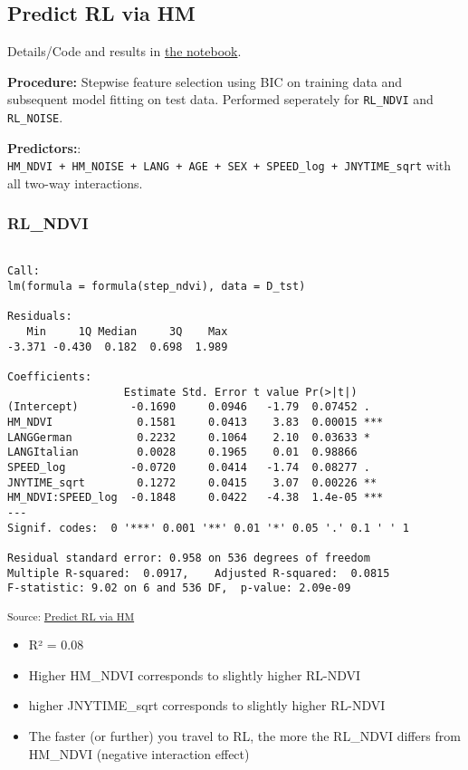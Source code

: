 \documentclass[
  letterpaper,
  DIV=11,
  numbers=noendperiod]{scrartcl}
\providecommand{\tightlist}{%
  \setlength{\itemsep}{0pt}\setlength{\parskip}{0pt}}
\begin{document}
\subsection{Predict RL via HM}\label{predict-rl-via-hm}

Details/Code and results in \href{notebooks/RL-via-HM.qmd}{the
notebook}.

\textbf{Procedure:} Stepwise feature selection using BIC on training
data and subsequent model fitting on test data. Performed seperately for
\texttt{RL\_NDVI} and \texttt{RL\_NOISE}.

\textbf{Predictors:}:
\texttt{HM\_NDVI\ +\ HM\_NOISE\ +\ LANG\ +\ AGE\ +\ SEX\ +\ SPEED\_log\ +\ JNYTIME\_sqrt}
with all two-way interactions.

\subsubsection{RL\_NDVI}\label{rl_ndvi}

\begin{verbatim}

Call:
lm(formula = formula(step_ndvi), data = D_tst)

Residuals:
   Min     1Q Median     3Q    Max 
-3.371 -0.430  0.182  0.698  1.989 

Coefficients:
                  Estimate Std. Error t value Pr(>|t|)    
(Intercept)        -0.1690     0.0946   -1.79  0.07452 .  
HM_NDVI             0.1581     0.0413    3.83  0.00015 ***
LANGGerman          0.2232     0.1064    2.10  0.03633 *  
LANGItalian         0.0028     0.1965    0.01  0.98866    
SPEED_log          -0.0720     0.0414   -1.74  0.08277 .  
JNYTIME_sqrt        0.1272     0.0415    3.07  0.00226 ** 
HM_NDVI:SPEED_log  -0.1848     0.0422   -4.38  1.4e-05 ***
---
Signif. codes:  0 '***' 0.001 '**' 0.01 '*' 0.05 '.' 0.1 ' ' 1

Residual standard error: 0.958 on 536 degrees of freedom
Multiple R-squared:  0.0917,    Adjusted R-squared:  0.0815 
F-statistic: 9.02 on 6 and 536 DF,  p-value: 2.09e-09
\end{verbatim}

\textsubscript{Source:
\href{https://LGraz.github.io/wsl--prs-analysis/notebooks/RL-via-HM-preview.html\#cell-lm-summary-rl-ndvi}{Predict
RL via HM}}

\begin{itemize}
\tightlist
\item
  R² = 0.08
\item
  Higher HM\_NDVI corresponds to slightly higher RL-NDVI
\item
  higher JNYTIME\_sqrt corresponds to slightly higher RL-NDVI
\item
  The faster (or further) you travel to RL, the more the RL\_NDVI
  differs from HM\_NDVI (negative interaction effect)
\end{itemize}
\end{document}
